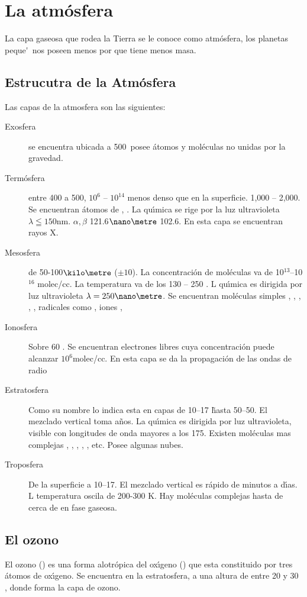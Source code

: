 \chapter{La atm\'osfera}
 
 La capa gaseosa que rodea la Tierra se le conoce como atm\'osfera, los planetas peque\'~nos poseen menos por que tiene menos masa.
 \section{Estrucutra de la Atm\'osfera}
 Las capas de la atmosfera son las siguientes:
 \begin{description}
\item[Exosfera ] se encuentra ubicada a 500\kilo\metre\, posee \'atomos y mol\'eculas no unidas por la gravedad.
\item[Term\'osfera] entre 400 a 500\kilo\metre, $10^6$ -- $10^{14}$ menos denso que en la superficie. 1,000 -- 2,000\kelvin. Se encuentran \'atomos de , . La qu\'{\i}mica se rige por la luz ultravioleta $\lambda\leqq 150$nm. $\alpha,\beta$ 121.6$\nano\metre$ 102.6\nano\metre. En esta capa se encuentran  rayos X.
\item[Mesosfera] de 50-100$\kilo\metre$  ($\pm10$). La concentraci\'on de mol\'eculas va de 10$^{13}$--10$^{16}$ molec/cc. La temperatura va de los 130 -- 250 \kelvin. L qu\'{\i}mica es dirigida por luz ultravioleta $\lambda=250\nano\metre$. Se encuentran mol\'eculas simples , , , , , radicales como ,  iones ,
\item[Ionosfera]Sobre 60 \kilo\metre. Se encuentran electrones libres cuya concentraci\'on puede alcanzar $10^6$molec/cc. En esta capa se da la propagaci\'on de las ondas de radio
\item[Estratosfera] Como su nombre lo indica esta en capas de 10--17 \kilo\metre\~hasta 50--50\kilo\metre. El mezclado vertical toma a\~nos. La qu\'{\i}mica es dirigida por luz ultravioleta, visible con longitudes de onda mayores a los 175\nano\metre. Existen mol\'eculas mas complejas , , , , , etc. Posee algunas nubes.
\item[Troposfera] De la superficie a 10--17\kilo\metre. El mezclado vertical es r\'apido de minutos a d\'{\i}as. L temperatura oscila de 200-300 K. Hay mol\'eculas complejas hasta de cerca de  en fase gaseosa.
\end{description}

\section{El ozono } 
 \label{esozono}
El ozono () es una forma alotr\'opica del ox\'{\i}geno () que esta constituido por tres \'atomos de ox\'{\i}geno. Se encuentra en la estratosfera, a una altura de entre 20 y 30 \kilo\metre , donde forma la capa de ozono.

